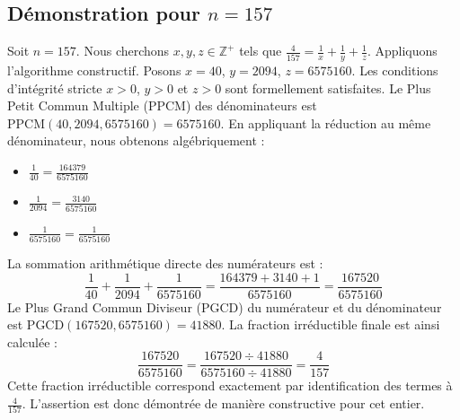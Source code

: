\documentclass[11pt,a4paper]{article}
\begin{document}
\subsection{Démonstration pour $n = 157$}
Soit $n = 157$. Nous cherchons $x, y, z \in \mathbb{Z}^{+}$ tels que $\frac{4}{157} = \frac{1}{x} + \frac{1}{y} + \frac{1}{z}$.
Appliquons l'algorithme constructif. Posons $x = 40$, $y = 2094$, $z = 6575160$.
Les conditions d'intégrité stricte $x > 0$, $y > 0$ et $z > 0$ sont formellement satisfaites.
Le Plus Petit Commun Multiple (PPCM) des dénominateurs est $\text{PPCM}(40, 2094, 6575160) = 6575160$.
En appliquant la réduction au même dénominateur, nous obtenons algébriquement :
\begin{itemize}
    \item $\frac{1}{40} = \frac{164379}{6575160}$
    \item $\frac{1}{2094} = \frac{3140}{6575160}$
    \item $\frac{1}{6575160} = \frac{1}{6575160}$
\end{itemize}
La sommation arithmétique directe des numérateurs est :
$$ \frac{1}{40} + \frac{1}{2094} + \frac{1}{6575160} = \frac{164379 + 3140 + 1}{6575160} = \frac{167520}{6575160} $$
Le Plus Grand Commun Diviseur (PGCD) du numérateur et du dénominateur est $\text{PGCD}(167520, 6575160) = 41880$.
La fraction irréductible finale est ainsi calculée :
$$ \frac{167520}{6575160} = \frac{167520 \div 41880}{6575160 \div 41880} = \frac{4}{157} $$
Cette fraction irréductible correspond exactement par identification des termes à $\frac{4}{157}$. L'assertion est donc démontrée de manière constructive pour cet entier.
\end{document}
